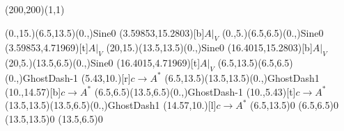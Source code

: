 \unitlength=1bp%

\begin{feynartspicture}(200,200)(1,1)

\FADiagram{}
\FAProp(0.,15.)(6.5,13.5)(0.,){Sine}{0}
\FALabel(3.59853,15.2803)[b]{$A|_V$}
\FAProp(0.,5.)(6.5,6.5)(0.,){Sine}{0}
\FALabel(3.59853,4.71969)[t]{$A|_V$}
\FAProp(20,15.)(13.5,13.5)(0.,){Sine}{0}
\FALabel(16.4015,15.2803)[b]{$A|_V$}
\FAProp(20,5.)(13.5,6.5)(0.,){Sine}{0}
\FALabel(16.4015,4.71969)[t]{$A|_V$}
\FAProp(6.5,13.5)(6.5,6.5)(0.,){GhostDash}{-1}
\FALabel(5.43,10.)[r]{$c\to A^*$}
\FAProp(6.5,13.5)(13.5,13.5)(0.,){GhostDash}{1}
\FALabel(10.,14.57)[b]{$c\to A^*$}
\FAProp(6.5,6.5)(13.5,6.5)(0.,){GhostDash}{-1}
\FALabel(10.,5.43)[t]{$c\to A^*$}
\FAProp(13.5,13.5)(13.5,6.5)(0.,){GhostDash}{1}
\FALabel(14.57,10.)[l]{$c\to A^*$}
\FAVert(6.5,13.5){0}
\FAVert(6.5,6.5){0}
\FAVert(13.5,13.5){0}
\FAVert(13.5,6.5){0}
\end{feynartspicture}

